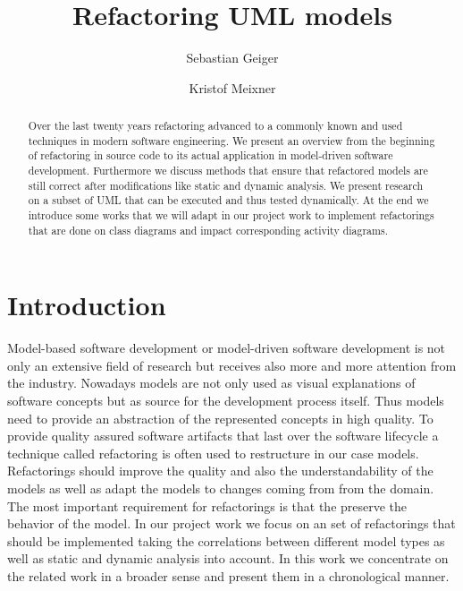 \documentclass{llncs}
\begin{document}
\pagestyle{plain}

\title{Refactoring UML models}
\author{Sebastian Geiger \and Kristof Meixner}

\maketitle

\begin{abstract}
Over the last twenty years refactoring advanced to a commonly known and used techniques in modern software engineering. We present an overview from the beginning of refactoring in source code to its actual application in model-driven software development. Furthermore we discuss methods that ensure that refactored models are still correct after modifications like static and dynamic analysis. We present research on a subset of UML that can be executed and thus tested dynamically. At the end we introduce some works that we will adapt in our project work to implement refactorings that are done on class diagrams and impact corresponding activity diagrams.
\end{abstract}

\tableofcontents
\newpage


\section{Introduction}
\label{sec:intro}

Model-based software development or model-driven software development is not only an extensive field of research but receives also more and more attention from the industry. Nowadays models are not only used as visual explanations of software concepts but as source for the development process itself. Thus models need to provide an abstraction of
the represented concepts in high quality. To provide quality assured software artifacts that last over the software lifecycle a technique called refactoring is often used to restructure in our case models. Refactorings should improve the quality and also the understandability of the models as well as adapt the models to changes coming from from the domain. The most important requirement for refactorings is that the preserve the behavior of the model. In our project work we focus on an set of refactorings that should be implemented taking the correlations between different model types as well as static and dynamic analysis into account. In this work we concentrate on the related work in a broader sense and present them in a chronological manner.
\end{document}
